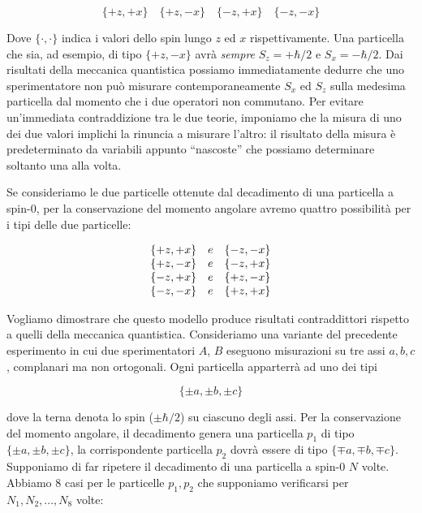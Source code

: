 	\begin{equation}
		\{ +z, +x \} \quad \{ +z, -x \} \quad \{ -z, +x \} \quad \{ -z, -x \}
	\end{equation}

Dove $\{ \cdot, \cdot \} $ indica i valori dello spin lungo $z$ ed $x$ rispettivamente. Una particella che sia, ad esempio, di tipo $\{ +z, -x \}$ avr\`a \textit{sempre} $S_z = + \hbar / 2$ e $S_x = - \hbar / 2$. Dai risultati della meccanica quantistica possiamo immediatamente dedurre che uno sperimentatore non pu\`o misurare contemporaneamente $S_x$ ed $S_z$ sulla medesima particella dal momento che i due operatori non commutano. Per evitare un'immediata contraddizione tra le due teorie, imponiamo che la misura di uno dei due valori implichi la rinuncia a misurare l'altro: il risultato della misura \`e predeterminato da variabili appunto ``nascoste'' che possiamo determinare soltanto una alla volta.

Se consideriamo le due particelle ottenute dal decadimento di una particella a spin-0, per la conservazione del momento angolare avremo quattro possibilit\`a per i tipi delle due particelle:

	\begin{equation}
		\begin{array}{c c c}
			\{ +z, +x \} & e & \{ -z, -x \} \\
			\{ +z, -x \} & e & \{ -z, +x \} \\
			\{ -z, +x \} & e & \{ +z, -x \} \\
			\{ -z, -x \} & e & \{ +z, +x \} \\
		\end{array}
	\end{equation}

Vogliamo dimostrare che questo modello produce risultati contraddittori rispetto a quelli della meccanica quantistica. Consideriamo una variante del precedente esperimento in cui due sperimentatori $A$, $B$ eseguono misurazioni su tre assi $a, b, c$, complanari ma non ortogonali. Ogni particella apparterr\`a ad uno dei tipi

	\[
		\{ \pm a, \pm b, \pm c\}
	\]

dove la terna denota lo spin ($\pm \hbar / 2$) su ciascuno degli assi. Per la conservazione del momento angolare, il decadimento genera una particella $p_1$ di tipo $\{ \pm a, \pm b, \pm c \}$, la corrispondente particella $p_2$ dovr\`a essere di tipo $ \{ \mp a, \mp b, \mp c \}$. Supponiamo di far ripetere il decadimento di una particella a spin-0 $N$ volte. Abbiamo 8 casi per le particelle $p_1, p_2$ che supponiamo verificarsi per $N_1, N_2, ..., N_8$ volte:

